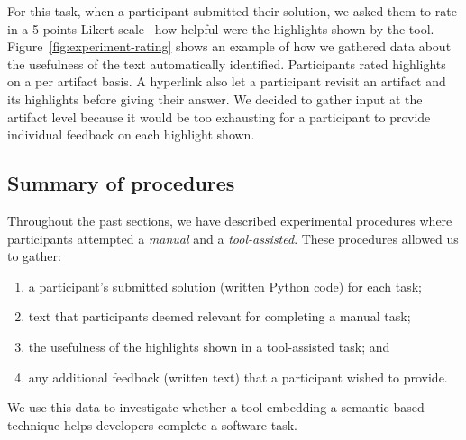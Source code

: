 For this task, when a participant submitted their solution, we asked them to 
rate in a 5 points Likert scale~\cite{likert1932technique} how helpful were the highlights shown by the tool.
Figure~\ref{fig:experiment-rating} shows an example of how we gathered data about the usefulness of the text automatically identified.
Participants rated highlights on a per artifact basis. A hyperlink also let a participant 
revisit an artifact and its highlights before giving their answer.
We decided to gather input at the artifact level because it would be too exhausting for a participant 
to provide individual feedback on each highlight shown.











\subsection{Summary of procedures}


Throughout the past sections, we have described experimental procedures 
where participants attempted a \textit{manual} and a \textit{tool-assisted}.
These procedures allowed us to gather:


\begin{enumerate}
\item a participant's submitted solution (written Python code) for each task;
\item text that participants deemed relevant for completing a manual task;
\item the usefulness of the highlights shown in a tool-assisted task; and
\item any additional feedback (written text) that a participant wished to provide.
\end{enumerate}


We use this data to investigate whether 
a tool embedding a semantic-based technique helps developers complete a software task. 


\clearpage


